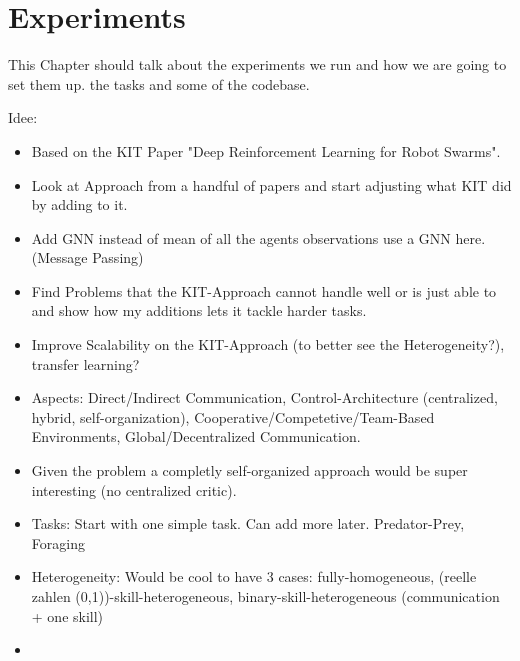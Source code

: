 
\chapter{Experiments}
\label{ch:Experiments}

This Chapter should talk about the experiments we run and how we are going to set them up. the tasks and some of the codebase.

Idee:
\begin{itemize}[noitemsep,nolistsep]
    \item Based on the KIT Paper "Deep Reinforcement Learning for Robot Swarms".
    \item Look at Approach from a handful of papers and start adjusting what KIT did by adding to it.
    \item Add GNN instead of mean of all the agents observations use a GNN here. (Message Passing)
    \item Find Problems that the KIT-Approach cannot handle well or is just able to and show how my additions lets it tackle harder tasks.
    \item Improve Scalability on the KIT-Approach (to better see the Heterogeneity?), transfer learning?
    \item Aspects: Direct/Indirect Communication, Control-Architecture (centralized, hybrid, self-organization), Cooperative/Competetive/Team-Based Environments, Global/Decentralized Communication.
    \item Given the problem a completly self-organized approach would be super interesting (no centralized critic).
    \item Tasks: Start with one simple task. Can add more later. Predator-Prey, Foraging
    \item Heterogeneity: Would be cool to have 3 cases: fully-homogeneous, (reelle zahlen (0,1))-skill-heterogeneous, binary-skill-heterogeneous (communication + one skill)
    \item 
\end{itemize} 